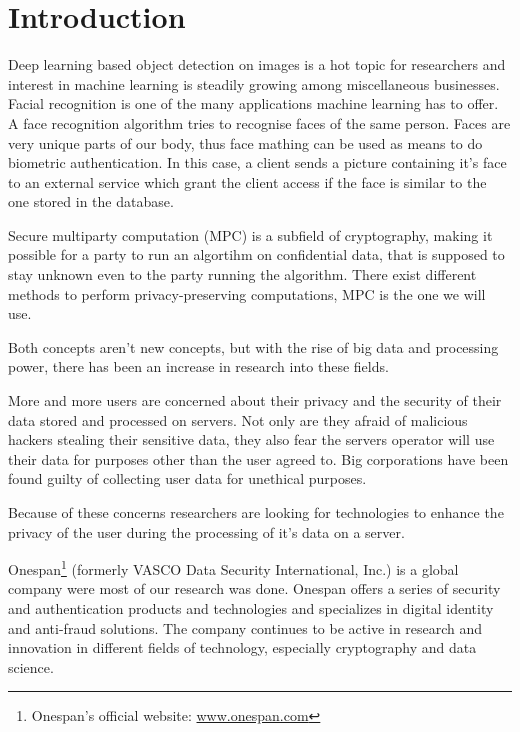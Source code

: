 
\chapter{Introduction}
Deep learning based object detection on images is a hot topic for researchers and interest in machine learning is steadily growing among miscellaneous businesses. Facial recognition is one of the many applications machine learning has to offer. A face recognition algorithm tries to recognise faces of the same person. Faces are very unique parts of our body, thus face mathing can be used as means to do biometric authentication. In this case, a client sends a picture containing it's face to an external service which grant the client access if the face is similar to the one stored in the database.

Secure multiparty computation (MPC) is a subfield of cryptography, making it possible for a party to run an algortihm on confidential data, that is supposed to stay unknown even to the party running the algorithm. There exist different methods to perform privacy-preserving computations, MPC is the one we will use.

Both concepts aren't new concepts, but with the rise of big data and processing power, there has been an increase in research into these fields.

More and more users are concerned about their privacy and the security of their data stored and processed on servers. Not only are they afraid of malicious hackers stealing their sensitive data, they also fear the servers operator will use their data for purposes other than the user agreed to. Big corporations have been found guilty of collecting user data for unethical purposes.

Because of these concerns researchers are looking for technologies to enhance the privacy of the user during the processing of it's data on a server.

Onespan\footnote{Onespan's official website: \url{www.onespan.com}} (formerly VASCO Data Security International, Inc.) is a global company were most of our research was done. Onespan offers a series of security and authentication products and technologies and specializes in digital identity and anti-fraud solutions. The company continues to be active in research and innovation in different fields of technology, especially cryptography and data science.

